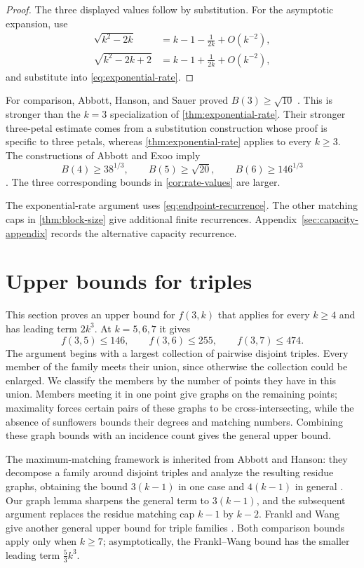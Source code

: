 \documentclass[11pt]{article}
\numberwithin{equation}{section}
\theoremstyle{definition}
\theoremstyle{remark}
\begin{document}
\begin{proof}
The three displayed values follow by substitution. For the asymptotic
expansion, use
\begin{align*}
 \sqrt{k^2-2k}
   &=k-1-\frac{1}{2k}+O(k^{-2}),\\
 \sqrt{k^2-2k+2}
   &=k-1+\frac{1}{2k}+O(k^{-2}),
\end{align*}
and substitute into \cref{eq:exponential-rate}.
\end{proof}

For comparison, Abbott, Hanson, and Sauer proved
$B(3)\ge\sqrt{10}$ \cite{AbbottHansonSauer1972}. This is stronger than the
$k=3$ specialization of \cref{thm:exponential-rate}. Their stronger
three-petal estimate comes from a substitution construction whose proof is
specific to three petals, whereas \cref{thm:exponential-rate} applies to
every $k\ge3$. The constructions of Abbott and Exoo imply
\[
 B(4)\ge38^{1/3},
 \qquad
 B(5)\ge\sqrt{20},
 \qquad
 B(6)\ge146^{1/3}
\]
\cite{AbbottExoo1992}. The three corresponding bounds in
\cref{cor:rate-values} are larger.

The exponential-rate argument uses \cref{eq:endpoint-recurrence}. The other
matching caps in \cref{thm:block-size} give additional finite recurrences.
Appendix~\ref{sec:capacity-appendix} records the alternative capacity
recurrence.

\section{Upper bounds for triples}
\label{sec:triple-upper}

This section proves an upper bound for $f(3,k)$ that applies for every
$k\ge4$ and has leading term $2k^3$. At $k=5,6,7$ it gives
\[
 f(3,5)\le146,
 \qquad
 f(3,6)\le255,
 \qquad
 f(3,7)\le474.
\]
The argument begins with a largest collection of pairwise disjoint triples.
Every member of the family meets their union, since otherwise the collection
could be enlarged. We classify the members by the number of points they have
in this union. Members meeting it in one point give graphs on the remaining
points; maximality forces certain pairs of these graphs to be
cross-intersecting, while the absence of sunflowers bounds their degrees and
matching numbers. Combining these graph bounds with an incidence count gives
the general upper bound.

The maximum-matching framework is inherited from Abbott and Hanson: they
decompose a family around disjoint triples and analyze the resulting residue
graphs, obtaining the bound $3(k-1)$ in one case and $4(k-1)$ in general
\cite{AbbottHanson1974}. Our graph lemma sharpens the general term to
$3(k-1)$, and the subsequent argument replaces the residue matching cap
$k-1$ by $k-2$. Frankl and Wang give another general upper bound for triple
families \cite[Theorem~1.14]{FranklWang2025}. Both comparison bounds apply
only when $k\ge7$; asymptotically, the Frankl--Wang bound has the smaller
leading term $\frac53k^3$.
\end{document}
